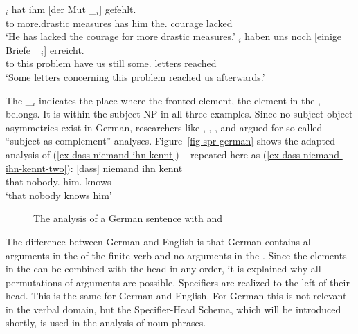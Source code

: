 \ex 
{}$_i$ hat ihm [der Mut \_$_i$] gefehlt.\\
     \spacebr{}to more.drastic measures has him \spacebr{}the.\NOM{} courage {} lacked\\
\glt `He has lacked the courage for more drastic measures.'
\ex 
{}$_i$ haben uns noch [einige Briefe \_$_i$] erreicht.\footnotemark\\
     \spacebr{}to this problem have us still \spacebr{}some.\NOM{} letters {} reached\\
\glt `Some letters concerning this problem reached us afterwards.'
\zl

\noindent
The \_$_i$ indicates the place where the fronted element, the element in the \vf, belongs. It is
within the subject NP in all three examples. Since no subject-object asymmetries exist in German,
researchers like \citet[]{Pollard90a}, \citet[Section~6.3.2]{Haider93a}, \citet[]{Eisenberg94b}, and \citet[, 78]{Kiss95a} argued for so-called ``subject as complement'' analyses. 
Figure~\vref{fig-spr-german} shows the adapted analysis of
(\ref{ex-dass-niemand-ihn-kennt}) -- repeated here as
(\ref{ex-dass-niemand-ihn-kennt-two}):
\ea
\label{ex-dass-niemand-ihn-kennt-two}
\gll  {}[dass] niemand ihn kennt\\
      \spacebr{}that nobody.\NOM{} him.\ACC{} knows\\ 
\glt `that nobody knows him'
\z
\begin{figure}
\caption{\label{fig-spr-german}The analysis of a German sentence with \spr and \compsl}
\end{figure}
\largerpage
The difference between German and English is that German contains all arguments in the \compsl of
the finite verb and no arguments in the \sprl. Since the elements in the \compsl can be combined
with the head in any order, it is explained why all permutations of arguments are
possible. Specifiers are realized to the left of their head. This is the same for German and
English. For German this is not relevant in the verbal domain, but the Specifier-Head Schema, which
will be introduced shortly, is used in the analysis of noun phrases.

